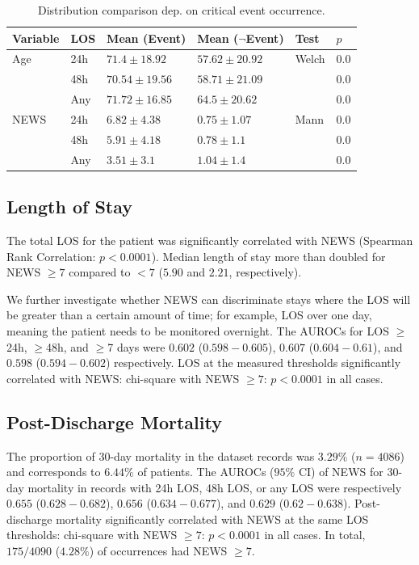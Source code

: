 \documentclass[10pt,journal, compsoc]{IEEEtran}
\begin{document}
\begin{table}[!t]
    \renewcommand{\arraystretch}{1.3}
    \centering
    \caption{Distribution comparison dep. on critical event occurrence.}
    \label{tab:criticalevent_stats}
    \begin{tabular}{llllll}
        \toprule
        Variable & LOS & Mean (Event)      & Mean ($\lnot$Event) & Test  & $p$   \\
        \midrule
        Age      & 24h & $71.4 \pm 18.92$  & $57.62 \pm 20.92$   & Welch & $0.0$ \\
                 & 48h & $70.54 \pm 19.56$ & $58.71 \pm 21.09$   &       & $0.0$ \\
                 & Any & $71.72 \pm 16.85$ & $64.5 \pm 20.62$    &       & $0.0$ \\
        NEWS     & 24h & $6.82 \pm 4.38$   & $0.75 \pm 1.07$     & Mann  & $0.0$ \\
                 & 48h & $5.91 \pm 4.18$   & $0.78 \pm 1.1$      &       & $0.0$ \\
                 & Any & $3.51 \pm 3.1$    & $1.04 \pm 1.4$      &       & $0.0$ \\

        \bottomrule
    \end{tabular}
\end{table}

\subsection{Length of Stay} The total LOS for the patient was significantly correlated with NEWS (Spearman Rank Correlation: $p < 0.0001$). Median length of stay more than doubled for NEWS $\geq 7$ compared to $<7$ ($5.90$ and $2.21$, respectively).

We further investigate whether NEWS can discriminate stays where the LOS will be greater than a certain amount of time; for example, LOS over one day, meaning the patient needs to be monitored overnight. The AUROCs for LOS $\geq$24h, $\geq$48h, and $\geq$7 days were $0.602$ ($0.598-0.605$), $0.607$ ($0.604-0.61$), and $0.598$ ($0.594-0.602$) respectively. LOS at the measured thresholds significantly correlated with NEWS: chi-square with NEWS $\geq 7$: $p < 0.0001$ in all cases.

\subsection{Post-Discharge Mortality}
The proportion of 30-day mortality in the dataset records was $3.29\%$ ($n=4086$) and corresponds to $6.44\%$ of patients. The AUROCs ($95\%$ CI) of NEWS for 30-day mortality in records with 24h LOS, 48h LOS, or any LOS were respectively $0.655$ ($0.628-0.682$), $0.656$ ($0.634-0.677$), and $0.629$ ($0.62-0.638$). Post-discharge mortality significantly correlated with NEWS at the same LOS thresholds: chi-square with NEWS $\geq 7$: $p < 0.0001$ in all cases. In total, $175/4090$ ($4.28\%$) of occurrences had NEWS $\geq 7$.
\end{document}
